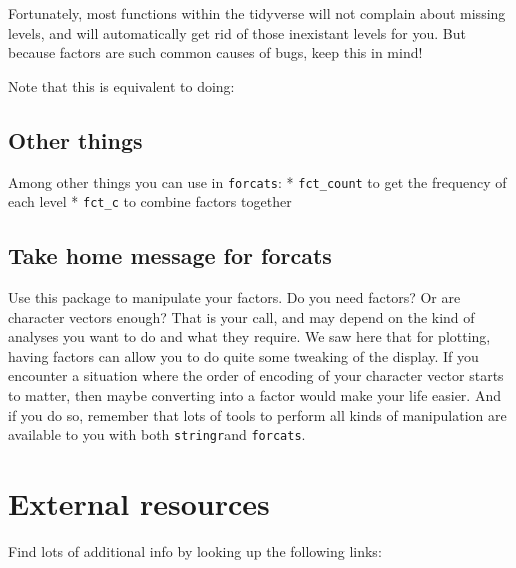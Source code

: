 \documentclass[]{book}
\newenvironment{Shaded}{}{}
\newcommand{\KeywordTok}[1]{\textcolor[rgb]{0.00,0.44,0.13}{\textbf{#1}}}
\newcommand{\NormalTok}[1]{#1}
\newcommand{\OperatorTok}[1]{\textcolor[rgb]{0.40,0.40,0.40}{#1}}
\newcommand{\StringTok}[1]{\textcolor[rgb]{0.25,0.44,0.63}{#1}}
\begin{document}
Fortunately, most functions within the tidyverse will not complain about missing levels, and will automatically get rid of those inexistant levels for you. But because factors are such common causes of bugs, keep this in mind!

Note that this is equivalent to doing:

\begin{Shaded}
\end{Shaded}

\hypertarget{other-things}{%
\subsection{Other things}\label{other-things}}

Among other things you can use in \texttt{forcats}:
* \texttt{fct\_count} to get the frequency of each level
* \texttt{fct\_c} to combine factors together

\hypertarget{take-home-message-for-forcats}{%
\subsection{Take home message for forcats}\label{take-home-message-for-forcats}}

Use this package to manipulate your factors. Do you need factors? Or are character vectors enough? That is your call, and may depend on the kind of analyses you want to do and what they require. We saw here that for plotting, having factors can allow you to do quite some tweaking of the display. If you encounter a situation where the order of encoding of your character vector starts to matter, then maybe converting into a factor would make your life easier. And if you do so, remember that lots of tools to perform all kinds of manipulation are available to you with both \texttt{stringr}and \texttt{forcats}.

\hypertarget{external-resources}{%
\section{External resources}\label{external-resources}}

Find lots of additional info by looking up the following links:
\end{document}
